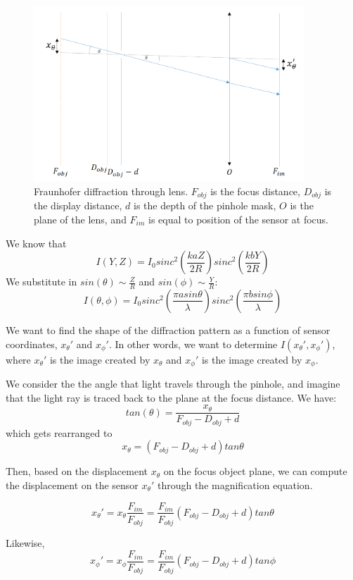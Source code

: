 \begin{figure}[ht]
  \centering
  \includegraphics[width=4in]{chapters/chapter8/images/Lens_Diffraction.png}
  \caption{Fraunhofer diffraction through lens. $F_{obj}$ is the focus distance, $D_{obj}$ is the display distance, $d$ is the depth of the pinhole mask, $O$ is the plane of the lens, and $F_{im}$ is equal to position of the sensor at focus.}
  \label{fig:ferrari}
\end{figure}

We know that $$I(Y,Z) = I_0  sinc^2\left(\frac{kaZ}{2R}\right) sinc^2\left(\frac{kbY}{2R}\right)$$
We substitute in $sin(\theta) \sim \frac{Z}{R}$ and $sin(\phi) \sim \frac{Y}{R}$:
$$I(\theta,\phi) = I_0  sinc^2\left(\frac{\pi a sin \theta}{\lambda}\right) sinc^2 \left(\frac{\pi b sin \phi}{\lambda}\right)$$

We want to find the shape of the diffraction pattern as a function of sensor coordinates, $x_{\theta}'$ and $x_{\phi}'$. In other words, we want to determine $I(x_{\theta}', x_{\phi}')$, where $x_{\theta}'$ is the image created by $x_{\theta}$ and $x_{\phi}'$ is the image created by $x_{\phi}$. 

We consider the the angle that light travels through the pinhole, and imagine that the light ray is traced back to the plane at the focus distance. We have: 
$$tan(\theta) = \frac{x_{\theta}}{F_{obj} - D_{obj} + d}$$ 
which gets rearranged to 
$$x_{\theta} = (F_{obj} - D_{obj} + d) tan\theta$$

Then, based on the displacement $x_{\theta}$ on the focus object plane, we can compute the displacement on the sensor $x_{\theta}'$ through the magnification equation. 

$$x_{\theta}' = x_{\theta} \frac{F_{im}}{F_{obj}} =  \frac{F_{im}}{F_{obj}} (F_{obj} - D_{obj} + d) tan\theta $$

Likewise, $$x_{\phi}' = x_{\phi} \frac{F_{im}}{F_{obj}} =  \frac{F_{im}}{F_{obj}} (F_{obj} - D_{obj} + d) tan\phi $$

